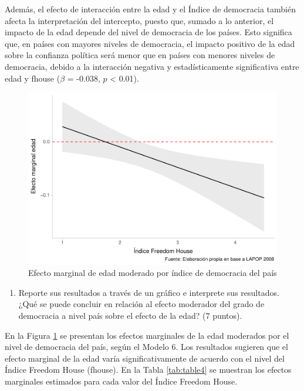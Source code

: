 \documentclass[
  12pt,
  a4paper,
]{article}
\providecommand{\tightlist}{%
  \setlength{\itemsep}{0pt}\setlength{\parskip}{0pt}}
\begin{document}
Además, el efecto de interacción entre la edad y el Índice de democracia también afecta la interpretación del intercepto, puesto que, sumado a lo anterior, el impacto de la edad depende del nivel de democracia de los países. Esto significa que, en países con mayores niveles de democracia, el impacto positivo de la edad sobre la confianza política será menor que en países con menores niveles de democracia, debido a la interacción negativa y estadísticamente significativa entre edad y fhouse (\(\beta\) = -0.038, \(p\) \textless{} 0.01).

\begin{figure}

{\centering \includegraphics[width=0.8\linewidth]{01-guia_files/figure-latex/fig4-1} 

}

\caption{Efecto marginal de edad moderado por índice de democracia del país}\label{fig:fig4}
\end{figure}

\begin{enumerate}
\def\labelenumi{\alph{enumi})}
\setcounter{enumi}{1}
\tightlist
\item
  Reporte sus resultados a través de un gráfico e interprete sus resultados. ¿Qué se puede concluir en relación al efecto moderador del grado de democracia a nivel país sobre el efecto de la edad? (7 puntos).
\end{enumerate}

En la Figura \ref{fig:fig4} se presentan los efectos marginales de la edad moderados por el nivel de democracia del país, según el Modelo 6. Los resultados sugieren que el efecto marginal de la edad varía significativamente de acuerdo con el nivel del Índice Freedom House (fhouse). En la Tabla \ref{tab:table4} se muestran los efectos marginales estimados para cada valor del Índice Freedom House.
\end{document}
